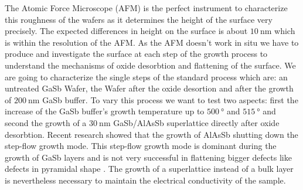 %


The Atomic Force Microscope (AFM) is the perfect instrument to characterize this roughness of the wafers as it determines the height of the surface very precisely. The expected differences in height on the surface is about $\SI{10}{\nano\meter}$ which is within the resolution of the AFM.
As the AFM doesn't work in situ we have to produce and investigate the surface at each step of the growth process to understand the mechanisms of oxide desorbtion and flattening of the surface. We are going to characterize the single steps of the standard process which are: an untreated GaSb Wafer, the Wafer after the oxide desortion and after the growth of $\SI{200}{\nano\meter}$ GaSb buffer. To vary this process we want to test two aspects: first the increase of the GaSb buffer's growth temperature up to $\SI{500}{\degree}$ and $\SI{515}{\degree}$ and second the growth of a $\SI{30}{\nano\meter}$ GaSb/AlAsSb superlattice directly after oxide desorbtion. Recent research showed that the growth of AlAsSb shutting down the step-flow growth mode. This  step-flow growth mode is dominant during the growth of GaSb layers and is not very successful in flattening bigger defects like defects in pyramidal shape \cite{murray}. The growth of a superlattice instead of a bulk layer is nevertheless necessary to maintain the electrical conductivity of the sample.

